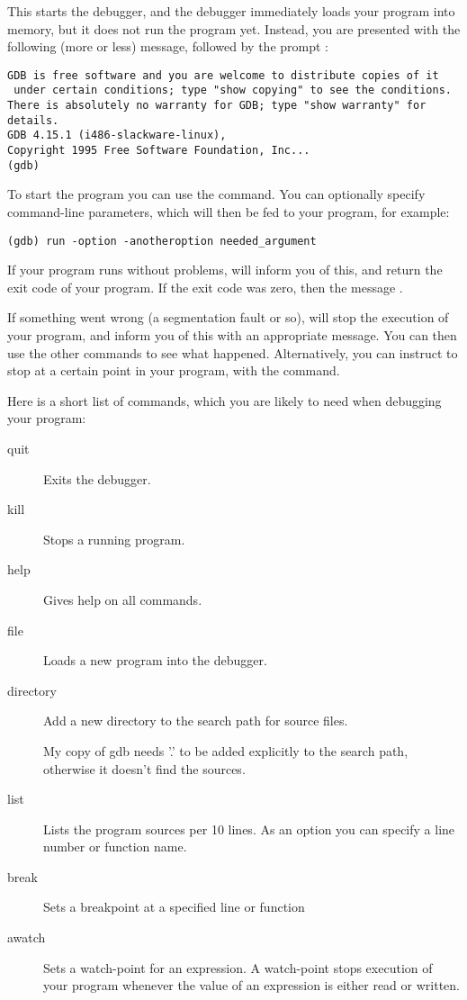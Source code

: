 \documentclass{report}
\begin{document}
This starts the debugger, and the debugger immediately loads your program
into memory, but it does not run the program yet. Instead, you are presented
with the following (more or less) message, followed by the  prompt
:
\begin{verbatim}
GDB is free software and you are welcome to distribute copies of it
 under certain conditions; type "show copying" to see the conditions.
There is absolutely no warranty for GDB; type "show warranty" for details.
GDB 4.15.1 (i486-slackware-linux),
Copyright 1995 Free Software Foundation, Inc...
(gdb)
\end{verbatim}
To start the program you can use the  command. You can optionally
specify command-line parameters, which will then be fed to your program, for
example:
\begin{verbatim}
(gdb) run -option -anotheroption needed_argument
\end{verbatim}
If your program runs without problems,  will inform you of this,
and return the exit code of your program. If the exit code was zero, then
the message .

If something went wrong (a segmentation fault or so),  will stop
the execution of your program, and inform you of this with an appropriate
message. You can then use the other  commands to see what happened.
Alternatively, you can instruct  to stop at a certain point in your
program, with the  command.

Here is a short list of  commands, which you are likely to need when
debugging your program:
\begin{description}
\item [quit\ ] Exits the debugger.
\item [kill\ ] Stops a running program.
\item [help\ ] Gives help on all  commands.
\item [file\ ] Loads a new program into the debugger.
\item [directory\ ] Add a new directory to the search path for source
files.\\
\begin{remark} My copy of gdb needs '.' to be added explicitly to the search
path, otherwise it doesn't find the sources.
\end{remark}
\item [list\ ] Lists the program sources per 10 lines. As an option you can
specify a line number or function name.
\item [break\ ] Sets a breakpoint at a specified line or function
\item [awatch\ ] Sets a watch-point for an expression. A watch-point stops
execution of your program whenever the value of an expression is either
read or written.
\end{description}
\end{document}
